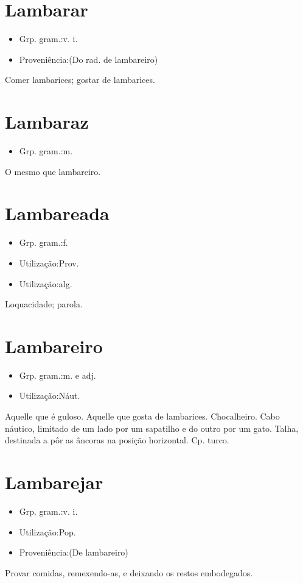 \section{Lambarar}
\begin{itemize}
\item {Grp. gram.:v. i.}
\end{itemize}
\begin{itemize}
\item {Proveniência:(Do rad. de \textunderscore lambareiro\textunderscore )}
\end{itemize}
Comer lambarices; gostar de lambarices.
\section{Lambaraz}
\begin{itemize}
\item {Grp. gram.:m.}
\end{itemize}
O mesmo que \textunderscore lambareiro\textunderscore .
\section{Lambareada}
\begin{itemize}
\item {Grp. gram.:f.}
\end{itemize}
\begin{itemize}
\item {Utilização:Prov.}
\end{itemize}
\begin{itemize}
\item {Utilização:alg.}
\end{itemize}
Loquacidade; parola.
\section{Lambareiro}
\begin{itemize}
\item {Grp. gram.:m.  e  adj.}
\end{itemize}
\begin{itemize}
\item {Utilização:Náut.}
\end{itemize}
Aquelle que é guloso.
Aquelle que gosta de lambarices.
Chocalheiro.
Cabo náutico, limitado de um lado por um sapatilho e do outro por um gato.
Talha, destinada a pôr as âncoras na posição horizontal. Cp. \textunderscore turco\textunderscore .
\section{Lambarejar}
\begin{itemize}
\item {Grp. gram.:v. i.}
\end{itemize}
\begin{itemize}
\item {Utilização:Pop.}
\end{itemize}
\begin{itemize}
\item {Proveniência:(De \textunderscore lambareiro\textunderscore )}
\end{itemize}
Provar comidas, remexendo-as, e deixando os restos embodegados.
